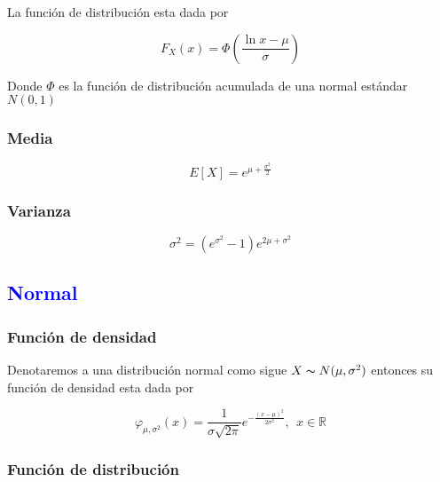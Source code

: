 \documentclass{article}
\begin{document}
\begin{multicols}{2}
                La función de distribución esta dada por

                    \begin{equation*}
                        F_X(x) = \Phi \left( \frac{\ln x -\mu}{\sigma} \right)
                    \end{equation*}

                Donde $\Phi$ es la función de distribución acumulada de una normal estándar $N(0,1)$

            \subsubsection{Media}

                \begin{equation*}
                    E[X] = e^{\mu + \frac{\sigma ^2}{2}}
                \end{equation*}
                
            \subsubsection{Varianza}

                \begin{equation*}
                    \sigma ^2 = \left( e^{\sigma ^2} -1\right) e^{2\mu +\sigma ^2}
                \end{equation*}

        \subsection{\textcolor{blue}{Normal}}

            \subsubsection{Función de densidad}

                Denotaremos a una distribución normal como sigue $X\thicksim N (\mu, \sigma ^2)$ entonces su función de densidad esta dada por
    
                    \begin{equation*}
                        \varphi_{\mu, \sigma ^2} (x) = \frac{1}{\sigma \sqrt{2\pi}} e^{-\frac{(x-\mu)^2}{2\sigma ^2}}, ~~x \in \mathbb{R}
                    \end{equation*}

            \subsubsection{Función de distribución}


\end{multicols}
\end{document}
